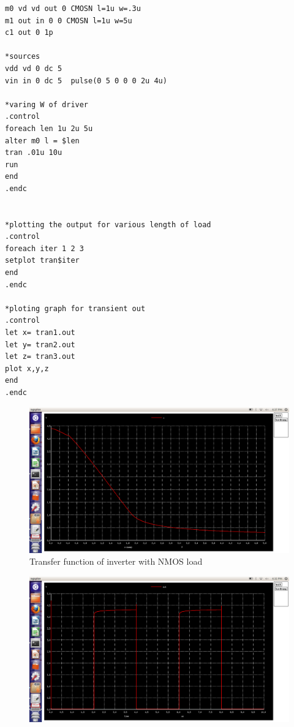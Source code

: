 \documentclass[12pt,a4paper]{article}
\begin{document}
\begin{center}
\begin{lstlisting}
m0 vd vd out 0 CMOSN l=1u w=.3u 
m1 out in 0 0 CMOSN l=1u w=5u	
c1 out 0 1p

*sources
vdd vd 0 dc 5 
vin in 0 dc 5  pulse(0 5 0 0 0 2u 4u)

*varing W of driver
.control
foreach len 1u 2u 5u
alter m0 l = $len
tran .01u 10u
run 
end
.endc


*plotting the output for various length of load
.control
foreach iter 1 2 3
setplot tran$iter
end
.endc

*ploting graph for transient out
.control
let x= tran1.out
let y= tran2.out
let z= tran3.out
plot x,y,z
end
.endc

\end{lstlisting}


\begin{figure}[!ht]
\centering
\includegraphics[scale=0.37]{lab4_pic4_1_trsnfer_fun_only.png}

\caption[Short]{Transfer function of  inverter with NMOS load}
\end{figure}

\begin{figure}[!ht]
\centering
\includegraphics[scale=0.37]{lab4_pic4_2_transient_out.png}


\end{figure}
\end{center}
\end{document}
